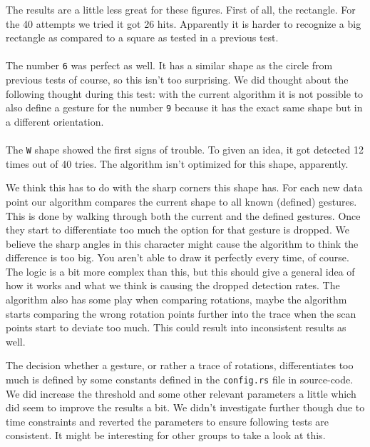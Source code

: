 \documentclass[a4paper]{article}
\begin{document}
  The results are a little less great for these figures. First of all, the
  rectangle. For the 40 attempts we tried it got 26 hits. Apparently it is
  harder to recognize a big rectangle as compared to a square as tested in a
  previous test.

  \paragraph{}
  The number \verb_6_ was perfect as well. It has a similar shape as the circle
  from previous tests of course, so this isn't too surprising.
  We did thought about the following thought during this test: with the current
  algorithm it is not possible to also define a gesture for the number \verb_9_
  because it has the exact same shape but in a different orientation.

  \paragraph{}
  The \verb_W_ shape showed the first signs of trouble. To given an idea, it got
  detected 12 times out of 40 tries. The algorithm isn't optimized for this
  shape, apparently.

  We think this has to do with the sharp corners this shape
  has. For each new data point our algorithm compares the current shape to all
  known (defined) gestures. This is done by walking through both the current and
  the defined gestures. Once they start to differentiate too much the option for
  that gesture is dropped. We believe the sharp angles in this character might
  cause the algorithm to think the difference is too big. You aren't able to
  draw it perfectly every time, of course. The logic is a bit more complex than
  this, but this should give a general idea of how it works and what we think is
  causing the dropped detection rates. The algorithm also has some play when
  comparing rotations, maybe the algorithm starts comparing the wrong rotation
  points further into the trace when the scan points start to deviate too much.
  This could result into inconsistent results as well.

  The decision whether a gesture, or rather a trace of rotations, differentiates
  too much is defined by some constants defined in the \verb_config.rs_ file in
  source-code. We did increase the threshold and some other relevant parameters
  a little which did seem to improve the results a bit. We didn't investigate
  further though due to time constraints and reverted the parameters to ensure
  following tests are consistent. It might be interesting for other groups to
  take a look at this.
\end{document}
